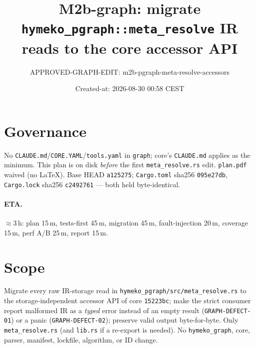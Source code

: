 \documentclass[11pt]{article}
\title{M2b-graph: migrate \texttt{hymeko\_pgraph::meta\_resolve} IR reads to the core accessor API}
\author{APPROVED-GRAPH-EDIT: m2b-pgraph-meta-resolve-accessors}
\date{Created-at: 2026-08-30 00:58 CEST}
\begin{document}
\maketitle

\section*{Governance}
No \texttt{CLAUDE.md}/\texttt{CORE.YAML}/\texttt{tools.yaml} in \texttt{graph}; core's
\texttt{CLAUDE.md} applies as the minimum. This plan is on disk \emph{before} the
first \texttt{meta\_resolve.rs} edit. \texttt{plan.pdf} waived (no LaTeX). Base HEAD
\texttt{a125275}; \texttt{Cargo.toml} sha256 \texttt{095e27db}, \texttt{Cargo.lock}
sha256 \texttt{c2492761} --- both held byte-identical.

\paragraph{ETA.} $\approx$3\,h: plan 15\,m, tests-first 45\,m, migration 45\,m,
fault-injection 20\,m, coverage 15\,m, perf A/B 25\,m, report 15\,m.

\section{Scope}
Migrate every raw IR-storage read in \texttt{hymeko\_pgraph/src/meta\_resolve.rs}
to the storage-independent accessor API of core \texttt{15223bc}; make the strict
consumer report malformed IR as a \emph{typed} error instead of an empty result
(\texttt{GRAPH-DEFECT-01}) or a panic (\texttt{GRAPH-DEFECT-02}); preserve valid
output byte-for-byte. Only \texttt{meta\_resolve.rs} (and \texttt{lib.rs} if a
re-export is needed). No \texttt{hymeko\_graph}, core, parser, manifest, lockfile,
algorithm, or ID change.
\end{document}
